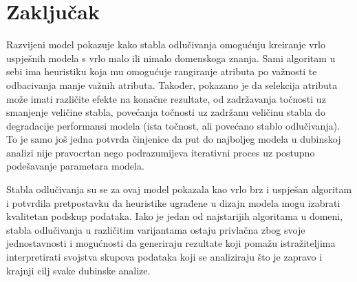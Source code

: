 \section*{Zaključak}
\label{ch:conc}

Razvijeni model pokazuje kako stabla odlučivanja omogućuju kreiranje vrlo uspješnih modela s vrlo malo ili nimalo domenskoga znanja. Sami algoritam u sebi ima heuristiku koja mu omogućuje rangiranje atributa po važnosti te odbacivanja manje važnih atributa. Također, pokazano je da selekcija atributa može imati različite efekte na konačne rezultate, od zadržavanja točnosti uz smanjenje veličine stabla, povećanja točnosti uz zadržanu veličinu stabla do degradacije performansi modela (ista točnost, ali povećano stablo odlučivanja). To je samo još jedna potvrda činjenice da put do najboljeg modela u dubinskoj analizi nije pravocrtan nego podrazumijeva iterativni proces uz postupno podešavanje parametara modela.

Stabla odlučivanja su se za ovaj model pokazala kao vrlo brz i uspješan algoritam i potvrdila pretpostavku da heuristike ugrađene u dizajn modela mogu izabrati kvalitetan podskup podataka. Iako je jedan od najstarijih algoritama u domeni, stabla odlučivanja u različitim varijantama ostaju privlačna zbog svoje jednostavnosti i mogućnosti da generiraju rezultate koji pomažu istražiteljima interpretirati svojstva skupova podataka koji se analiziraju što je zapravo i krajnji cilj svake dubinske analize.
